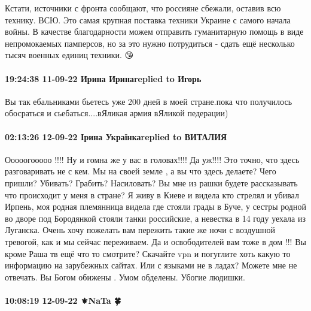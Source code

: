 Кстати, источники с фронта сообщают, что россияне сбежали, оставив всю технику.
ВСЮ. Это самая крупная поставка техники Украине с самого начала войны. В
качестве благодарности можем отправить гуманитарную помощь в виде непромокаемых
памперсов, но за это нужно потрудиться - сдать ещё несколько тысяч военных
единиц техники. 😘

\paragraph{19:24:38 11-09-22 Ирина Иринаreplied to Игорь}

Вы так ебальниками бьетесь уже 200 дней в моей стране.пока что получилось
обосраться и сьебаться....вЯликая армия вЯликой педерации)

\paragraph{02:13:26 12-09-22 Ірина Українкаreplied to ВИТАЛИЯ 🌹🌹}

Ооооогооооо !!!! Ну и гомна же у вас в головах!!!! Да уж!!!! Это точно, что здесь разговаривать не с кем.
Мы на своей земле , а вы что здесь делаете? Чего пришли? Убивать? Грабить? Насиловать? Вы мне из рашки будете рассказывать что происходит у меня в стране? Я живу в Киеве и видела кто стрелял и убивал Ирпень, моя родная племянница видела где стояли грады в Буче, у сестры родной во дворе под Бородянкой стояли танки российские, а невестка в 14 году уехала из Луганска. Очень хочу пожелать вам пережить такие же ночи с воздушной тревогой, как и мы сейчас переживаем. Да и освободителей вам тоже в дом !!! Вы кроме Раша тв ещё что то смотрите? Скачайте vpn и погуглите хоть какую то информацию на зарубежных сайтах. Или с языками не в ладах?
Можете мне не отвечать.
Вы Богом обижены . Умом обделены. Убогие людишки.

\paragraph{10:08:19 12-09-22 ⚜️NaTa 🍀}

